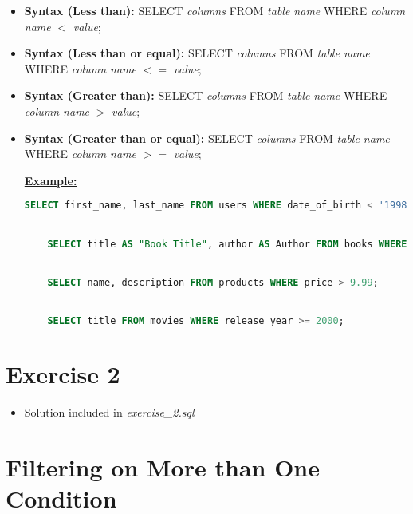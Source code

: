 \documentclass[12pt]{article}
\begin{document}
\begin{itemize}
    \item \textbf{Syntax (Less than):} SELECT \textit{columns} FROM \textit{table name} WHERE \textit{column name} $<$ \textit{value};
    \item \textbf{Syntax (Less than or equal):} SELECT \textit{columns} FROM \textit{table name} WHERE \textit{column name} $<=$ \textit{value};
    \item \textbf{Syntax (Greater than):} SELECT \textit{columns} FROM \textit{table name} WHERE \textit{column name} $>$ \textit{value};
    \item \textbf{Syntax (Greater than or equal):} SELECT \textit{columns} FROM \textit{table name} WHERE \textit{column name} $>=$ \textit{value};

    \bigskip

    \underline{\textbf{Example:}}

    \bigskip

    \begin{lstlisting}[language=SQL]
    SELECT first_name, last_name FROM users WHERE date_of_birth < '1998-12-01';


    SELECT title AS "Book Title", author AS Author FROM books WHERE year_released <= 2015;


    SELECT name, description FROM products WHERE price > 9.99;


    SELECT title FROM movies WHERE release_year >= 2000;
    \end{lstlisting}
\end{itemize}

\bigskip

\section{Exercise 2}

\bigskip

\begin{itemize}
    \item Solution included in \textit{exercise\_2.sql}
\end{itemize}

\bigskip

\section{Filtering on More than One Condition}

\bigskip
\end{document}
